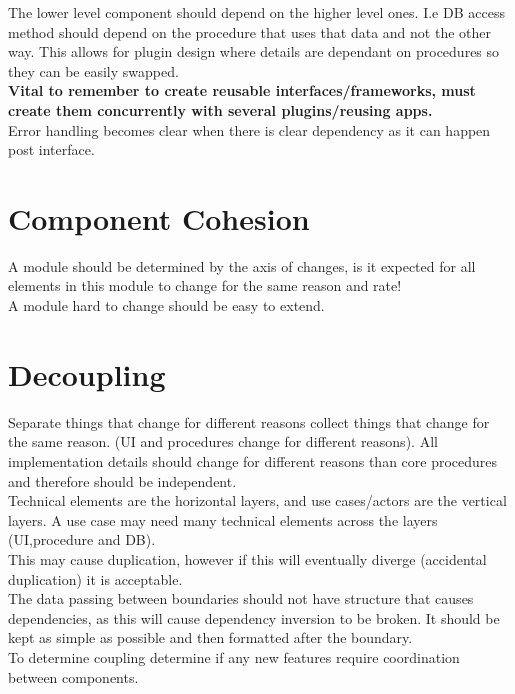 \documentclass[11pt]{scrartcl} %
\begin{document}
The lower level component should depend on the higher level ones. I.e DB access method should depend 
on the procedure that uses that data and not the other way. This allows for plugin design where details
are dependant on procedures so they can be easily swapped.\\

\textbf{Vital to remember to create reusable interfaces/frameworks, must create them concurrently with several plugins/reusing apps.}\\

Error handling becomes clear when there is clear dependency as it can happen post interface.

\section{Component Cohesion}

A module should be determined by the axis of changes, is it expected for all elements
in this module to change for the same reason and rate!\\

A module hard to change should be easy to extend.

\section{Decoupling}

Separate things that change for different reasons collect things that change for the same reason.
(UI and procedures change for different reasons). All implementation details should change for 
different reasons than core procedures and therefore should be independent.\\

Technical elements are the horizontal layers, and use cases/actors are the vertical layers. A use 
case may need many technical elements across the layers (UI,procedure and DB).\\

This may cause duplication, however if this will eventually diverge (accidental duplication) it is 
acceptable.\\

The data passing between boundaries should not have structure that causes dependencies, as this will
cause dependency inversion to be broken. It should be kept as simple as possible and then formatted
after the boundary.\\

To determine coupling determine if any new features require coordination between components.
\end{document}

